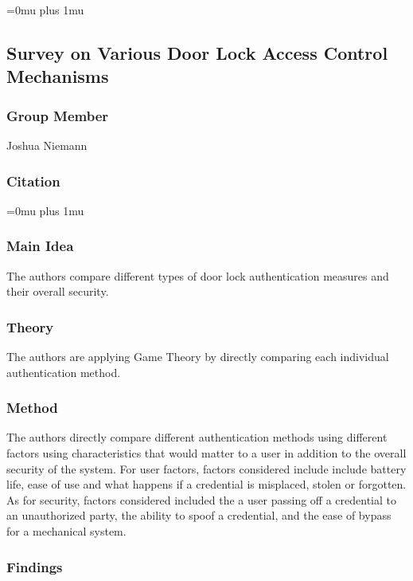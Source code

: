\Urlmuskip=0mu plus 1mu\relax

\noindent
\subsection{{S}urvey on {V}arious {D}oor {L}ock {A}ccess {C}ontrol {M}echanisms}

\noindent
\subsubsection{Group Member}

\noindent
Joshua Niemann

\noindent
\subsubsection{Citation}

\Urlmuskip=0mu plus 1mu\relax
{}

\subsubsection{Main Idea}

\noindent
The authors compare different types of door lock authentication measures and their overall security.

\subsubsection{Theory}

\noindent
The authors are applying Game Theory by directly comparing each individual authentication method.

\subsubsection{Method}

\noindent
The authors directly compare different authentication methods using different factors using characteristics that would matter to a user in addition to the overall security of the system.  For user factors, factors considered include include battery life, ease of use and what happens if a credential is misplaced, stolen or forgotten.  As for security, factors considered included the a user passing off a credential to an unauthorized party, the ability to spoof a credential, and the ease of bypass for a mechanical system.

\subsubsection{Findings}

